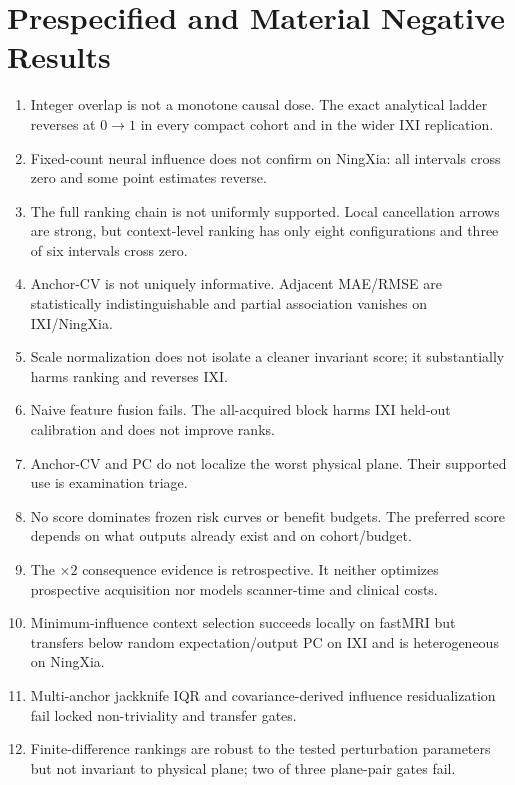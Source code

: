 \documentclass[10pt,twocolumn,letterpaper]{article}
\begin{document}
\section{Prespecified and Material Negative Results}
\label{sec:negative}
\begin{enumerate}
\item Integer overlap is not a monotone causal dose. The exact analytical ladder reverses at $0\to1$ in every compact cohort and in the wider IXI replication.
\item Fixed-count neural influence does not confirm on NingXia: all intervals cross zero and some point estimates reverse.
\item The full ranking chain is not uniformly supported. Local cancellation arrows are strong, but context-level ranking has only eight configurations and three of six intervals cross zero.
\item Anchor-CV is not uniquely informative. Adjacent MAE/RMSE are statistically indistinguishable and partial association vanishes on IXI/NingXia.
\item Scale normalization does not isolate a cleaner invariant score; it substantially harms ranking and reverses IXI.
\item Naive feature fusion fails. The all-acquired block harms IXI held-out calibration and does not improve ranks.
\item Anchor-CV and PC do not localize the worst physical plane. Their supported use is examination triage.
\item No score dominates frozen risk curves or benefit budgets. The preferred score depends on what outputs already exist and on cohort/budget.
\item The $\times2$ consequence evidence is retrospective. It neither optimizes prospective acquisition nor models scanner-time and clinical costs.
\item Minimum-influence context selection succeeds locally on fastMRI but transfers below random expectation/output PC on IXI and is heterogeneous on NingXia.
\item Multi-anchor jackknife IQR and covariance-derived influence residualization fail locked non-triviality and transfer gates.
\item Finite-difference rankings are robust to the tested perturbation parameters but not invariant to physical plane; two of three plane-pair gates fail.
\end{enumerate}
\end{document}
